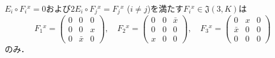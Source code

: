 \documentclass[a4paper, leqno]{ltjsreport}
\begin{document}
\begin{screen}
  \(E_i \circ F_i{}^x = 0\)および\(2E_i \circ F_j{}^x = F_j{}^x\) (\(i\neq j\))を満たす\(F_i{}^x \in \mathfrak{J}(3, K)\)は
  \[
  F_1{}^x =
  \begin{pmatrix}
    0 & 0 & 0 \\
    0 & 0 & x \\
    0 & \bar{x} & 0
  \end{pmatrix}
  , \quad
  F_2{}^x =
  \begin{pmatrix}
    0 & 0 & \bar{x} \\
    0 & 0 & 0 \\
    x & 0 & 0
  \end{pmatrix}
  , \quad
  F_3{}^x =
  \begin{pmatrix}
    0 & x & 0 \\
    \bar{x} & 0 & 0 \\
    0 & 0 & 0
  \end{pmatrix}
  \]
  のみ．
\end{screen}
\end{document}
